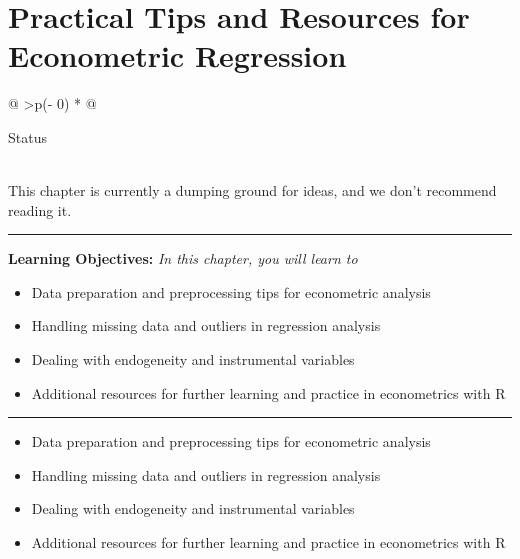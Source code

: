 \documentclass[
  letterpaper,
  paper =a4,
  twoside,
  openright,
  headsepline,
  footsepline,
  listof = totocnumbered,
  chapterprefix = true,
  firstiscover,
  parskip = full*]{scrbook}
\providecommand{\abstractname}{Learning Objectives} %
\newenvironment{objectives}[1]{%
	\hrule
	\vspace{5pt}
	\small\textbf{\abstractname: } 
	\newline
	\vspace{0.1cm}
	\small\emph{#1} %
	\itshape %
}{%
	\vspace{5pt}
	\hrule
	\vspace{0.6cm}
}
\begin{document}

\chapter{Practical Tips and Resources for Econometric
Regression}\label{practical-tips-and-resources-for-econometric-regression}

\begin{longtable}[]{@{}
  >{\centering\arraybackslash}p{(\columnwidth - 0\tabcolsep) * }@{}}
\toprule\noalign{}
\begin{minipage}[b]{\linewidth}\centering
Status
\end{minipage} \\
\midrule\noalign{}
\endhead
\bottomrule\noalign{}
\endlastfoot
This chapter is currently a dumping ground for ideas, and we don't
recommend reading it. \\
\end{longtable}

\begin{objectives}{In this chapter, you will learn to}
\begin{itemize}

\item{Data preparation and preprocessing tips for econometric analysis}

\item{Handling missing data and outliers in regression analysis}

\item{Dealing with endogeneity and instrumental variables}

\item{Additional resources for further learning and practice in econometrics with R}

\end{itemize}

\end{objectives}

\begin{itemize}
\item
  Data preparation and preprocessing tips for econometric analysis
\item
  Handling missing data and outliers in regression analysis
\item
  Dealing with endogeneity and instrumental variables
\item
  Additional resources for further learning and practice in econometrics
  with R
\end{itemize}
\end{document}
